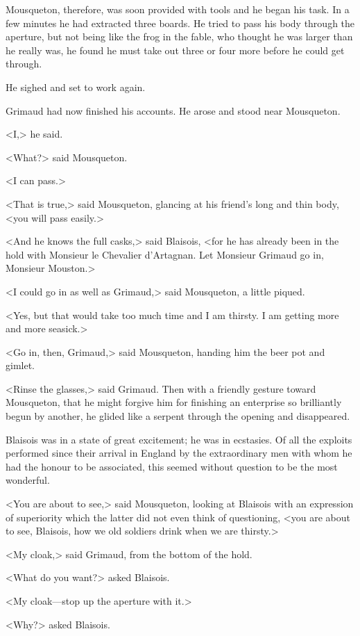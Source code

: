 Mousqueton, therefore, was soon provided with tools and he began his task. In a few minutes he had extracted three boards. He tried to pass his body through the aperture, but not being like the frog in the fable, who thought he was larger than he really was, he found he must take out three or four more before he could get through.

He sighed and set to work again.

Grimaud had now finished his accounts. He arose and stood near Mousqueton.

<I,> he said.

<What?> said Mousqueton.

<I can pass.>

<That is true,> said Mousqueton, glancing at his friend's long and thin body, <you will pass easily.>

<And he knows the full casks,> said Blaisois, <for he has already been in the hold with Monsieur le Chevalier d'Artagnan. Let Monsieur Grimaud go in, Monsieur Mouston.>

<I could go in as well as Grimaud,> said Mousqueton, a little piqued.

<Yes, but that would take too much time and I am thirsty. I am getting more and more seasick.>

<Go in, then, Grimaud,> said Mousqueton, handing him the beer pot and gimlet.

<Rinse the glasses,> said Grimaud. Then with a friendly gesture toward Mousqueton, that he might forgive him for finishing an enterprise so brilliantly begun by another, he glided like a serpent through the opening and disappeared.

Blaisois was in a state of great excitement; he was in ecstasies. Of all the exploits performed since their arrival in England by the extraordinary men with whom he had the honour to be associated, this seemed without question to be the most wonderful.

<You are about to see,> said Mousqueton, looking at Blaisois with an expression of superiority which the latter did not even think of questioning, <you are about to see, Blaisois, how we old soldiers drink when we are thirsty.>

<My cloak,> said Grimaud, from the bottom of the hold.

<What do you want?> asked Blaisois.

<My cloak—stop up the aperture with it.>

<Why?> asked Blaisois.

